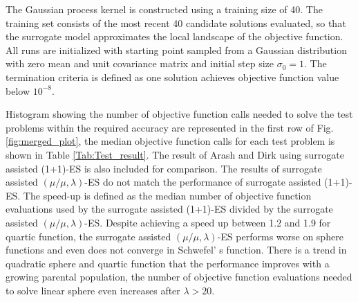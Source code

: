 The Gaussian process kernel is constructed using a training size of 40. The training set consists of the most recent 40 candidate solutions evaluated, so that the surrogate model approximates the local landscape of the objective function. All runs are initialized with starting point sampled from a Gaussian distribution with zero mean and unit covariance matrix and initial step size $\sigma_0=1$. The termination criteria is defined as one solution achieves objective function value below $10^{-8}$.

Histogram showing the number of objective function calls needed to solve the test problems within the required accuracy are represented in the first row of Fig. \ref{fig:merged_plot}, the median objective function calls for each test problem is shown in Table \ref{Tab:Test_result}. The result of Arash and Dirk \cite{DBLP:conf/ppsn/KayhaniA18} using surrogate assisted (1+1)-ES is also included for comparison. The results of surrogate assisted $(\mu/\mu,\lambda)$-ES do not match the performance of surrogate assisted (1+1)-ES. The speed-up is defined as the median number of objective function evaluations used by the surrogate assisted (1+1)-ES \cite{DBLP:conf/ppsn/KayhaniA18} divided by the surrogate assisted $(\mu/\mu,\lambda)$-ES. Despite achieving a speed up between 1.2 and 1.9 for quartic function, the surrogate assisted $(\mu/\mu,\lambda)$-ES performs worse on sphere functions and even does not converge in Schwefel' s function. There is a trend in quadratic sphere and quartic function that the performance improves with a growing parental population, the number of objective function evaluations needed to solve linear sphere even increases after $\lambda>20$. 

